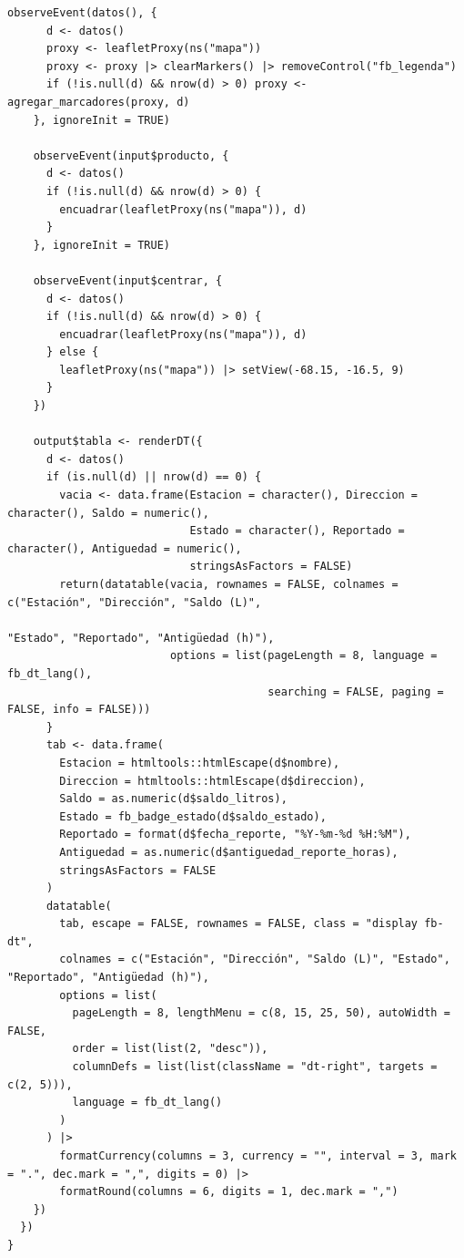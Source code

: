 \begin{lstlisting}[style=anexoR]
    observeEvent(datos(), {
      d <- datos()
      proxy <- leafletProxy(ns("mapa"))
      proxy <- proxy |> clearMarkers() |> removeControl("fb_legenda")
      if (!is.null(d) && nrow(d) > 0) proxy <- agregar_marcadores(proxy, d)
    }, ignoreInit = TRUE)

    observeEvent(input$producto, {
      d <- datos()
      if (!is.null(d) && nrow(d) > 0) {
        encuadrar(leafletProxy(ns("mapa")), d)
      }
    }, ignoreInit = TRUE)

    observeEvent(input$centrar, {
      d <- datos()
      if (!is.null(d) && nrow(d) > 0) {
        encuadrar(leafletProxy(ns("mapa")), d)
      } else {
        leafletProxy(ns("mapa")) |> setView(-68.15, -16.5, 9)
      }
    })

    output$tabla <- renderDT({
      d <- datos()
      if (is.null(d) || nrow(d) == 0) {
        vacia <- data.frame(Estacion = character(), Direccion = character(), Saldo = numeric(),
                            Estado = character(), Reportado = character(), Antiguedad = numeric(),
                            stringsAsFactors = FALSE)
        return(datatable(vacia, rownames = FALSE, colnames = c("Estación", "Dirección", "Saldo (L)",
                                                              "Estado", "Reportado", "Antigüedad (h)"),
                         options = list(pageLength = 8, language = fb_dt_lang(),
                                        searching = FALSE, paging = FALSE, info = FALSE)))
      }
      tab <- data.frame(
        Estacion = htmltools::htmlEscape(d$nombre),
        Direccion = htmltools::htmlEscape(d$direccion),
        Saldo = as.numeric(d$saldo_litros),
        Estado = fb_badge_estado(d$saldo_estado),
        Reportado = format(d$fecha_reporte, "%Y-%m-%d %H:%M"),
        Antiguedad = as.numeric(d$antiguedad_reporte_horas),
        stringsAsFactors = FALSE
      )
      datatable(
        tab, escape = FALSE, rownames = FALSE, class = "display fb-dt",
        colnames = c("Estación", "Dirección", "Saldo (L)", "Estado", "Reportado", "Antigüedad (h)"),
        options = list(
          pageLength = 8, lengthMenu = c(8, 15, 25, 50), autoWidth = FALSE,
          order = list(list(2, "desc")),
          columnDefs = list(list(className = "dt-right", targets = c(2, 5))),
          language = fb_dt_lang()
        )
      ) |>
        formatCurrency(columns = 3, currency = "", interval = 3, mark = ".", dec.mark = ",", digits = 0) |>
        formatRound(columns = 6, digits = 1, dec.mark = ",")
    })
  })
}
\end{lstlisting}

